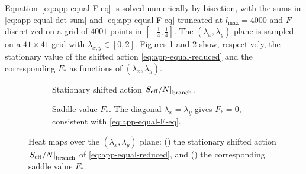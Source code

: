 \documentclass[a4paper,11pt]{article}
\begin{document}
\begin{appendix}
Equation~\eqref{eq:app-equal-F-eq} is solved numerically by bisection, with the sums in \eqref{eq:app-equal-det-sum} and \eqref{eq:app-equal-F-eq} truncated at $l_{\max}=4000$ and $F$ discretized on a grid of $4001$ points in $[-\tfrac14,\tfrac14]$. The $(\lambda_x,\lambda_y)$ plane is sampled on a $41\times 41$ grid with $\lambda_{x,y}\in[0,2]$.
Figures \ref{fig:app-action-heatmap} and \ref{fig:app-f-heatmap} show, respectively, the stationary value of the shifted action \eqref{eq:app-equal-reduced} and the corresponding $F_*$ as functions of $(\lambda_x,\lambda_y)$.

\begin{figure}[htbp]
\centering
\begin{subfigure}[t]{0.49\textwidth}
\centering
{}
\caption{Stationary shifted action $\left.S_{\rm eff}/N\right|_{\rm branch}$.}
\label{fig:app-action-heatmap}
\end{subfigure}
\hfill
\begin{subfigure}[t]{0.49\textwidth}
\centering
{}
\caption{Saddle value $F_*$. The diagonal $\lambda_x=\lambda_y$ gives $F_*=0$, consistent with \eqref{eq:app-equal-F-eq}.}
\label{fig:app-f-heatmap}
\end{subfigure}
\caption{Heat maps over the $(\lambda_x,\lambda_y)$ plane: () the stationary shifted action $\left.S_{\rm eff}/N\right|_{\rm branch}$ of \eqref{eq:app-equal-reduced}, and () the corresponding saddle value $F_*$.}
\label{fig:app-heatmaps}
\end{figure}



\end{appendix}




\end{document}
